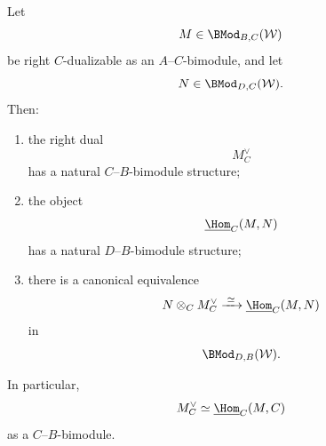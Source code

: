 \begin{proposition}
\label{prop:right-module-tensor-hom}
Let
\[
    M
    \in
    \BMod_{B,C}(\mathcal W)
\]
be right $C$-dualizable as an $A$--$C$-bimodule, and let
\[
    N
    \in
    \BMod_{D,C}(\mathcal W).
\]
Then:
\begin{enumerate}[label=(\roman*)]
    \item the right dual
    \[
        M_C^\vee
    \]
    has a natural $C$--$B$-bimodule structure;

    \item the object
    \[
        \underline{\Hom}_C(M,N)
    \]
    has a natural $D$--$B$-bimodule structure;

    \item there is a canonical equivalence
    \[
        N\otimes_C M_C^\vee
        \xrightarrow{\;\simeq\;}
        \underline{\Hom}_C(M,N)
    \]
    in
    \[
        \BMod_{D,B}(\mathcal W).
    \]
\end{enumerate}

In particular,
\[
    M_C^\vee
    \simeq
    \underline{\Hom}_C(M,C)
\]
as a $C$--$B$-bimodule.
\end{proposition}

